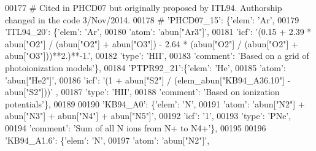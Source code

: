 \begin{DoxyCode}
00177 \textcolor{comment}{# Cited in PHCD07 but originally proposed by ITL94. Authorship changed in the code 3/Nov/2014. }
00178 \textcolor{comment}{#                         'PHCD07\_15': \{'elem': 'Ar',}
00179                          \textcolor{stringliteral}{'ITL94\_20'}: \{\textcolor{stringliteral}{'elem'}: \textcolor{stringliteral}{'Ar'},
00180                                        \textcolor{stringliteral}{'atom'}: \textcolor{stringliteral}{'abun["Ar3"]'},
00181                                        \textcolor{stringliteral}{'icf'}: \textcolor{stringliteral}{'(0.15 + 2.39 * abun["O2"] / (abun["O2"] + abun["O3"]) - 2.64
       * (abun["O2"] / (abun["O2"] + abun["O3"]))**2.)**-1.'},
00182                                        \textcolor{stringliteral}{'type'}: \textcolor{stringliteral}{'HII'},   
00183                                        \textcolor{stringliteral}{'comment'}: \textcolor{stringliteral}{'Based on a grid of photoionization models'}\},
00184                          \textcolor{stringliteral}{'PTPR92\_21'}:\{\textcolor{stringliteral}{'elem'}: \textcolor{stringliteral}{'He'},
00185                                        \textcolor{stringliteral}{'atom'}: \textcolor{stringliteral}{'abun["He2"]'},
00186                                        \textcolor{stringliteral}{'icf'}: \textcolor{stringliteral}{'(1 + abun["S2"] / (elem\_abun["KB94\_A36.10"] -  abun["S2"]))'}
      ,
00187                                        \textcolor{stringliteral}{'type'}: \textcolor{stringliteral}{'HII'},
00188                                        \textcolor{stringliteral}{'comment'}: \textcolor{stringliteral}{'Based on ionization potentials'}\},
00189                          
00190                          \textcolor{stringliteral}{'KB94\_A0'}: \{\textcolor{stringliteral}{'elem'}: \textcolor{stringliteral}{'N'},
00191                                     \textcolor{stringliteral}{'atom'}: \textcolor{stringliteral}{'abun["N2"] + abun["N3"] + abun["N4"] + abun["N5"]'},
00192                                     \textcolor{stringliteral}{'icf'}: \textcolor{stringliteral}{'1'},
00193                                      \textcolor{stringliteral}{'type'}: \textcolor{stringliteral}{'PNe'},
00194                                      \textcolor{stringliteral}{'comment'}: \textcolor{stringliteral}{'Sum of all N ions from N+ to N4+'}\},
00195                          
00196                          \textcolor{stringliteral}{'KB94\_A1.6'}: \{\textcolor{stringliteral}{'elem'}: \textcolor{stringliteral}{'N'},
00197                                      \textcolor{stringliteral}{'atom'}: \textcolor{stringliteral}{'abun["N2"]'},

\end{DoxyCode}
